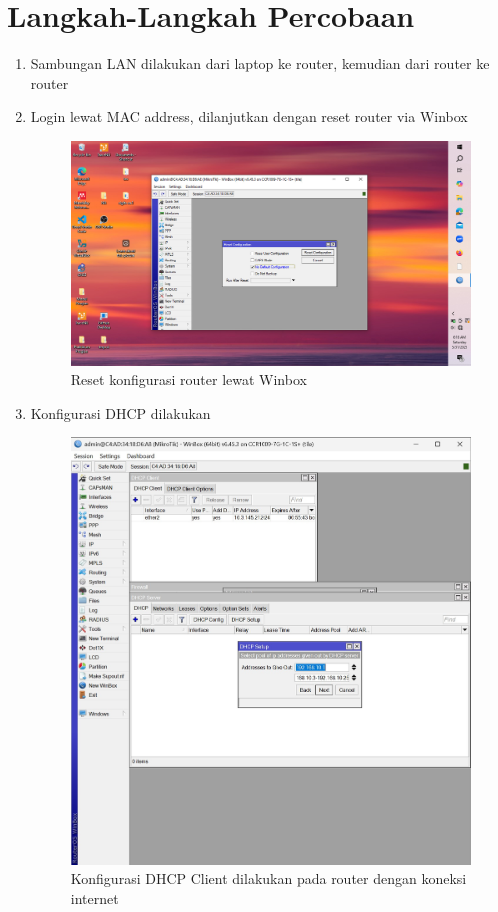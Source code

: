 \section{Langkah-Langkah Percobaan}

\begin{enumerate}
    \item Sambungan LAN dilakukan dari laptop ke router, kemudian dari router ke router
    \item Login lewat MAC address, dilanjutkan dengan reset router via Winbox
    \begin{figure}[H]
        \centering
        \includegraphics[width=0.5\linewidth]{P1/img/gambar1.jpeg}
        \caption{Reset konfigurasi router lewat Winbox}
        \label{fig:reset-router}
    \end{figure}

    \item Konfigurasi DHCP dilakukan
    \begin{figure}[H]
        \centering
        \includegraphics[width=0.5\linewidth]{P1/img/gambar2.jpeg}
        \caption{Konfigurasi DHCP Client dilakukan pada router dengan koneksi internet}
        \label{fig:DHCP-router-A}
    \end{figure}
    

\end{enumerate}
